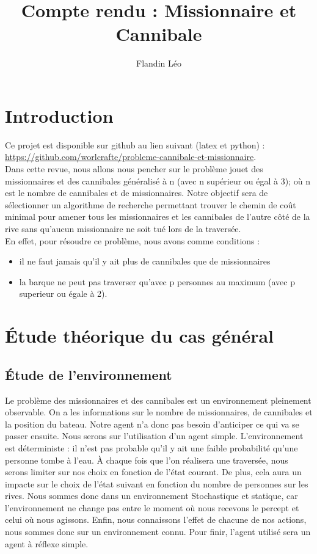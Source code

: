 \documentclass[a4paper, 12pt, french,oneside]{book}
\title{Compte rendu : Missionnaire et Cannibale}
\author{Flandin Léo}
\begin{document}
\maketitle
\tableofcontents

\mainmatter

\chapter{Introduction}
Ce projet est disponible sur github au lien suivant (latex et python) : \\
\url{https://github.com/worlcrafte/probleme-cannibale-et-missionnaire}. \\
Dans cette revue, nous allons nous pencher sur le problème jouet des missionnaires et des cannibales généralisé à n (avec n supérieur ou égal à 3); où n est le nombre de cannibales et de missionnaires. Notre objectif sera de sélectionner un algorithme de recherche permettant trouver le chemin de coût minimal pour amener tous les missionnaires et les cannibales de l'autre côté de la rive sans qu'aucun missionnaire ne soit tué lors de la traversée. \\
En effet, pour résoudre ce problème, nous avons comme conditions :
\begin{itemize}
    \item il ne faut jamais qu'il y ait plus de cannibales que de missionnaires
    \item la barque ne peut pas traverser qu'avec p personnes au maximum (avec p superieur ou égale à 2).
\end{itemize}
\chapter{Étude théorique du cas général}

\section{Étude de l'environnement}
Le problème des missionnaires et des cannibales est un environnement pleinement observable. On a les informations sur le nombre de missionnaires, de cannibales et la position du bateau. Notre agent n'a donc pas besoin d'anticiper ce qui va se passer ensuite. Nous serons sur l'utilisation d'un agent simple. L'environnement est déterministe : il n'est pas probable qu'il y ait une faible probabilité qu'une personne tombe à l'eau. À chaque fois que l'on réalisera une traversée, nous serons limiter sur nos choix en fonction de l'état courant. De plus, cela aura un impacte sur le choix de l'état suivant en fonction du nombre de personnes sur les rives. Nous sommes donc dans un environnement Stochastique et statique, car l'environnement ne change pas entre le moment où nous recevons le percept et celui où nous agissons. Enfin, nous connaissons l'effet de chacune de nos actions, nous sommes donc sur un environnement connu. Pour finir, l'agent utilisé sera un agent à réflexe simple.
\end{document}
